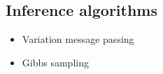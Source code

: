 \subsection{Inference algorithms}
\label{sec:inference}
\begin{itemize}
\item Variation message passing
\item Gibbs sampling
\end{itemize}

